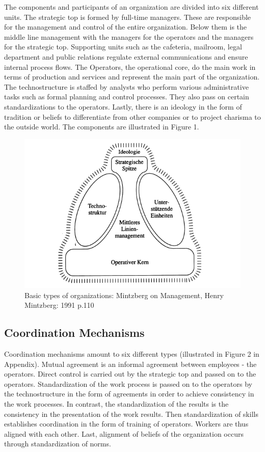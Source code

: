 \documentclass[a4paper,12pt]{article}
\begin{document}
The components and participants of an organization are divided into six
different units. The strategic top is formed by full-time managers. These are
responsible for the management and control of the entire organization. Below
them is the middle line management with the managers for the operators and the
managers for the strategic top. Supporting units such as the cafeteria,
mailroom, legal department and public relations regulate external
communications and ensure internal process flows. The Operators, the
operational core, do the main work in terms of production and services and
represent the main part of the organization. The technostructure is staffed by
analysts who perform various administrative tasks such as formal planning and
control processes. They also pass on certain standardizations to the
operators. Lastly, there is an ideology in the form of tradition or beliefs to
differentiate from other companies or to project charisma to the outside
world. The components are illustrated in Figure 1.

\begin{figure}[ht]
\centering
\includegraphics[scale=0.6]{basic_types.png}
\caption{Basic types of organizations: Mintzberg on Management, Henry
  Mintzberg: 1991 p.110}
\label{fig:basic_types}
\end{figure}

\subsection{Coordination Mechanisms}

Coordination mechanisms amount to six different types (illustrated in Figure 2
in Appendix). Mutual agreement is an informal agreement between employees -
the operators. Direct control is carried out by the strategic top and passed
on to the operators. Standardization of the work process is passed on to the
operators by the technostructure in the form of agreements in order to achieve
consistency in the work processes. In contrast, the standardization of the
results is the consistency in the presentation of the work results. Then
standardization of skills establishes coordination in the form of training of
operators. Workers are thus aligned with each other. Last, alignment of
beliefs of the organization occurs through standardization of norms.
\end{document}
